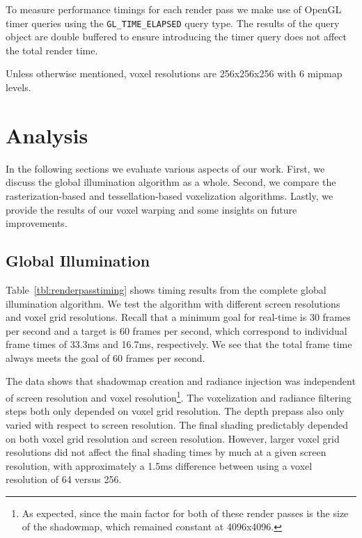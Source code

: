 To measure performance timings for each render pass we make use of OpenGL timer queries using the \verb#GL_TIME_ELAPSED# query type. The results of the query object are double buffered to ensure introducing the timer query does not affect the total render time.

Unless otherwise mentioned, voxel resolutions are 256x256x256 with 6 mipmap levels.

\section{Analysis}
In the following sections we evaluate various aspects of our work. First, we discuss the global illumination algorithm as a whole. Second, we compare the rasterization-based and tessellation-based voxelization algorithms. Lastly, we provide the results of our voxel warping and some insights on future improvements.

\subsection{Global Illumination}
Table~\ref{tbl:renderpasstiming} shows timing results from the complete global illumination algorithm. We test the algorithm with different screen resolutions and voxel grid resolutions. Recall that a minimum goal for real-time is 30 frames per second and a target is 60 frames per second, which correspond to individual frame times of 33.3ms and 16.7ms, respectively. We see that the total frame time always meets the goal of 60 frames per second.

The data shows that shadowmap creation and radiance injection was independent of screen resolution and voxel resolution\footnote{As expected, since the main factor for both of these render passes is the size of the shadowmap, which remained constant at 4096x4096.}. The voxelization and radiance filtering steps both only depended on voxel grid resolution. The depth prepass also only varied with respect to screen resolution. The final shading predictably depended on both voxel grid resolution and screen resolution. However, larger voxel grid resolutions did not affect the final shading times by much at a given screen resolution, with approximately a 1.5ms difference between using a voxel resolution of 64 versus 256.

